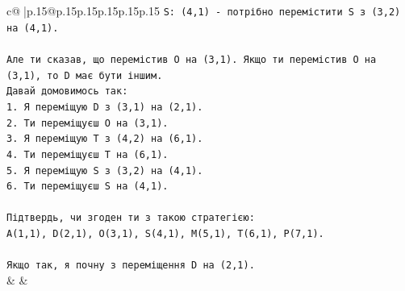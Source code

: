 \documentclass{article}
\begin{document}
{\begin{supertabular}{c@{$\;$}|p{.15\linewidth}@{}p{.15\linewidth}p{.15\linewidth}p{.15\linewidth}p{.15\linewidth}p{.15\linewidth}}
{{{\texttt{S: (4,1) {-} потрібно перемістити S з (3,2) на (4,1).} \\
\\ 
\texttt{Але ти сказав, що перемістив O на (3,1). Якщо ти перемістив O на (3,1), то D має бути іншим.} \\
\texttt{Давай домовимось так:} \\
\texttt{1. Я переміщую D з (3,1) на (2,1).} \\
\texttt{2. Ти переміщуєш O на (3,1).} \\
\texttt{3. Я переміщую T з (4,2) на (6,1).} \\
\texttt{4. Ти переміщуєш T на (6,1).} \\
\texttt{5. Я переміщую S з (3,2) на (4,1).} \\
\texttt{6. Ти переміщуєш S на (4,1).} \\
\\ 
\texttt{Підтвердь, чи згоден ти з такою стратегією:} \\
\texttt{A(1,1), D(2,1), O(3,1), S(4,1), M(5,1), T(6,1), P(7,1).} \\
\\ 
\texttt{Якщо так, я почну з переміщення D на (2,1).} \\
            }
        }
    }
    & & \\ \\


\end{supertabular}}
\end{document}
